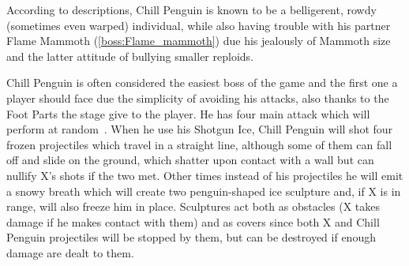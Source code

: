 According to descriptions, Chill Penguin is known to be a belligerent, rowdy (sometimes even warped) individual, while also having trouble with his partner Flame Mammoth (\ref{boss:Flame_mammoth}) due his jealously of Mammoth size and the latter attitude of bullying smaller reploids.


Chill Penguin is often considered the easiest boss of the game and the first one a player should face due the simplicity of avoiding his attacks, also thanks to the Foot Parts the stage give to the player. He has four main attack which will perform at random~\cite{wiki:Chill_Penguin}. When he use his Shotgun Ice, Chill Penguin will shot four frozen projectiles which travel in a straight line, although some of them  can fall off and slide on the ground, which shatter upon contact with a wall but can nullify X's shots if the two met. Other times instead of his projectiles he will emit a snowy breath which will create two penguin-shaped ice sculpture and, if X is in range, will also freeze him in place. Sculptures act both as obstacles (X takes damage if he makes contact with them) and as covers since both X and Chill Penguin projectiles will be stopped by them, but can be destroyed if enough damage are dealt to them.
